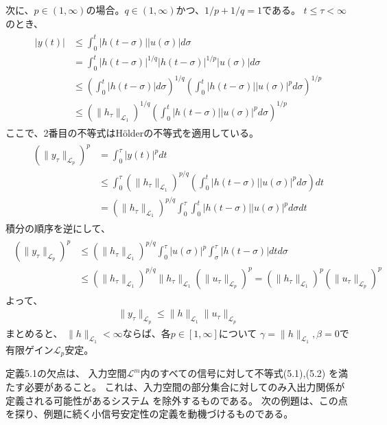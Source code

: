 \documentclass{jsarticle}
\begin{document}
次に、$p\in (1,\infty)$の場合。$q\in (1,\infty)$かつ、$1/p+1/q = 1$である。
$t\leq \tau<\infty$のとき、
\begin{align}
  \begin{aligned}
    |y(t)| & \leq \int^t_0 |h(t-\sigma)||u(\sigma)|d\sigma\\
    & = \int^t_0 |h(t-\sigma)|^{1/q}|h(t-\sigma)|^{1/p}|u(\sigma)| d\sigma\\
    & \leq \left( \int^t_0 |h(t-\sigma)|d\sigma \right)^{1/q} \left( \int^t_0|h(t-\sigma)||u(\sigma)|^pd\sigma \right)^{1/p}\\
    & \leq (\|h_\tau\|_{\mathcal L_1})^{1/q}\left( \int^t_0 |h(t-\sigma)||u(\sigma)|^p d\sigma\right)^{1/p}
  \end{aligned}
\end{align}
ここで、2番目の不等式はHölderの不等式を適用している。
\begin{align}
  \begin{aligned}
    (\|y_\tau\|_{\mathcal L_p})^p &= \int^\tau_0|y(t)|^p dt\\
    & \leq \int^\tau_0(\|h_\tau\|_{\mathcal L_1})^{p/q}\left( \int^t_0|h(t-\sigma)||u(\sigma)|^p d\sigma \right)dt\\
    & = (\|h_\tau\|_{\mathcal L_1})^{p/q}\int^\tau_0 \int^t_0 |h(t-\sigma)||u(\sigma)|^p d\sigma dt
  \end{aligned}
\end{align}
積分の順序を逆にして、
\begin{align}
  \begin{aligned}
    (\|y_\tau\|_{\mathcal L_p})^p &\leq (\|h_\tau\|_{\mathcal L_1})^{p/q}\int^\tau_0|u(\sigma)|^p \int^\tau_\sigma |h(t-\sigma)|dtd\sigma\\
    & \leq (\|h_\tau\|_{\mathcal L_1})^{p/q}\|h_\tau\|_{\mathcal L_1}(\|u_\tau\|_{\mathcal L_p})^p = (\|h_\tau\|_{\mathcal L_1})^p(\|u_\tau\|_{\mathcal L_p})^p
  \end{aligned}
\end{align}
よって、
\begin{align}
  \|y_\tau\|_{\mathcal L_p} \leq \|h\|_{\mathcal L_1} \|u_\tau\|_{\mathcal L_p}
\end{align}
まとめると、
$\|h\|_{\mathcal L_1}<\infty$ならば、各$p\in [1,\infty]$について
$\gamma = \|h\|_{\mathcal L_1},\beta = 0$で有限ゲイン$\mathcal L_p$安定。

{\color{gray}\hrulefill}

定義5.1の欠点は、
入力空間$\mathcal L^m$内のすべての信号に対して不等式(5.1),(5.2)
を満たす必要があること。
これは、入力空間の部分集合に対してのみ入出力関係が定義される可能性があるシステム
を除外するものである。
次の例題は、この点を探り、例題に続く小信号安定性の定義を動機づけるものである。
\end{document}
